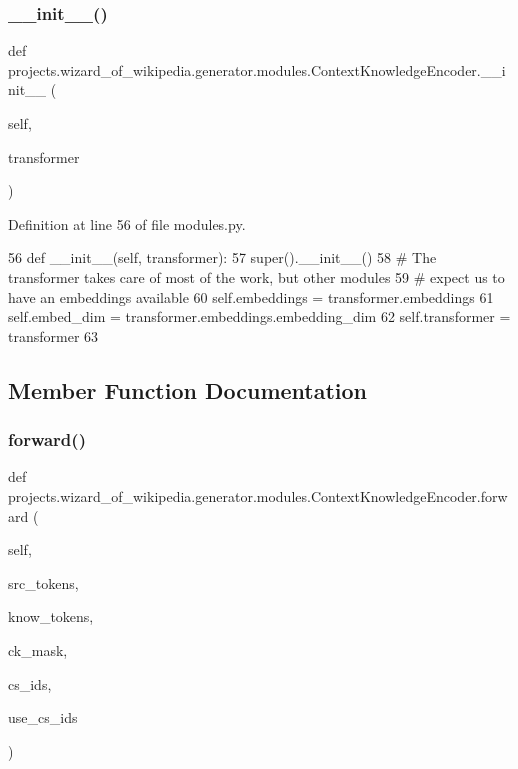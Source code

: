 \subsubsection{\texorpdfstring{\+\_\+\+\_\+init\+\_\+\+\_\+()}{\_\_init\_\_()}}
{\footnotesize\ttfamily def projects.\+wizard\+\_\+of\+\_\+wikipedia.\+generator.\+modules.\+Context\+Knowledge\+Encoder.\+\_\+\+\_\+init\+\_\+\+\_\+ (\begin{DoxyParamCaption}\item[{}]{self,  }\item[{}]{transformer }\end{DoxyParamCaption})}



Definition at line 56 of file modules.\+py.


\begin{DoxyCode}
56     \textcolor{keyword}{def }\_\_init\_\_(self, transformer):
57         super().\_\_init\_\_()
58         \textcolor{comment}{# The transformer takes care of most of the work, but other modules}
59         \textcolor{comment}{# expect us to have an embeddings available}
60         self.embeddings = transformer.embeddings
61         self.embed\_dim = transformer.embeddings.embedding\_dim
62         self.transformer = transformer
63 
\end{DoxyCode}


\subsection{Member Function Documentation}
\mbox{\label{classprojects_1_1wizard__of__wikipedia_1_1generator_1_1modules_1_1ContextKnowledgeEncoder_a482a0f0798408978ba2902159517d84b}} 
\subsubsection{\texorpdfstring{forward()}{forward()}}
{\footnotesize\ttfamily def projects.\+wizard\+\_\+of\+\_\+wikipedia.\+generator.\+modules.\+Context\+Knowledge\+Encoder.\+forward (\begin{DoxyParamCaption}\item[{}]{self,  }\item[{}]{src\+\_\+tokens,  }\item[{}]{know\+\_\+tokens,  }\item[{}]{ck\+\_\+mask,  }\item[{}]{cs\+\_\+ids,  }\item[{}]{use\+\_\+cs\+\_\+ids }\end{DoxyParamCaption})}



